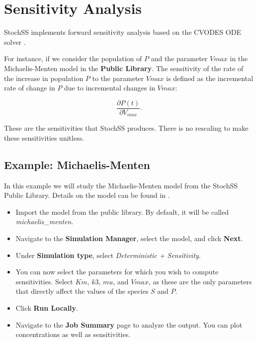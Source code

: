 \chapter{Sensitivity Analysis}

StochSS implements forward sensitivity analysis based on the CVODES ODE solver \cite{sundials}.

For instance, if we consider the population of $P$ and the parameter $Vmax$ in the Michaelis-Menten model in the \textbf{Public Library}. The sensitivity of the rate of the increase in population $P$ to the parameter $Vmax$ is defined as the incremental rate of change in $P$ due to incremental changes in $Vmax$:

\begin{equation}
\frac{\partial P(t)}{\partial V_{max}}.
\end{equation}

These are the sensitivities that StochSS produces. There is no rescaling to make these sensitivities unitless.

\section{Example: Michaelis-Menten}

In this example we will study the Michaelis-Menten model from the StochSS Public Library. Details on the model can be found in \cite{wiki-michaelis-menten}.
\begin{itemize}
\item Import the model from the public library. By default, it will be called \textit{michaelis\_menten}.
\item Navigate to the \textbf{Simulation Manager}, select the model, and click \textbf{Next}.
\item Under \textbf{Simulation type}, select \textit{Deterministic + Sensitivity}.
\item You can now select the parameters for which you wish to compute sensitivities. Select $Km$, $k3$, $mu$, and $Vmax$, as these are the only parameters that directly affect the values of the species $S$ and $P$.
\item Click \textbf{Run Locally}. 
\item Navigate to the \textbf{Job Summary} page to analyze the output. You can plot concentrations as well as sensitivities.
\end{itemize}

